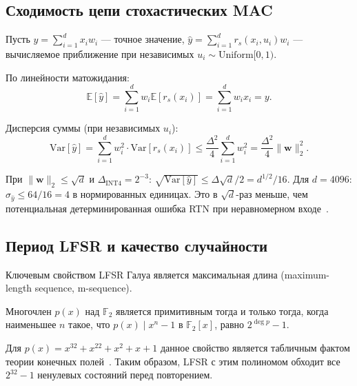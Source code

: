 \subsection{Сходимость цепи стохастических MAC}
\label{ssec:glava88-convergence}

Пусть $y = \sum_{i=1}^d x_i w_i$ — точное значение,
$\hat{y} = \sum_{i=1}^d r_s(x_i, u_i) w_i$ — вычисляемое приближение
при независимых $u_i \sim \mathrm{Uniform}[0,1)$.

По линейности матожидания:
\begin{equation}
  \mathbb{E}[\hat{y}] = \sum_{i=1}^d w_i \mathbb{E}[r_s(x_i)] = \sum_{i=1}^d w_i x_i = y.
  \label{eq:mac-unbiased}
\end{equation}

Дисперсия суммы (при независимых $u_i$):
\begin{equation}
  \mathrm{Var}[\hat{y}] = \sum_{i=1}^d w_i^2 \cdot \mathrm{Var}[r_s(x_i)]
  \leq \frac{\Delta^2}{4} \sum_{i=1}^d w_i^2 = \frac{\Delta^2}{4}\|\mathbf{w}\|_2^2.
  \label{eq:mac-variance}
\end{equation}

При $\|\mathbf{w}\|_2 \leq \sqrt{d}$ и $\Delta_{\text{INT4}} = 2^{-3}$:
$\sqrt{\mathrm{Var}[\hat{y}]} \leq \Delta \sqrt{d}/2 = d^{1/2} / 16$.
Для $d = 4096$: $\sigma_{\hat{y}} \leq 64/16 = 4$ в нормированных единицах.
Это в $\sqrt{d}$-раз меньше, чем потенциальная детерминированная
ошибка RTN при неравномерном входе~\cite{hubara2018}.

\subsection{Период LFSR и качество случайности}
\label{ssec:glava88-lfsr-period}

Ключевым свойством LFSR Галуа является максимальная длина
(maximum-length sequence, m-sequence).

\begin{proposition}
\label{prop:primitive-poly}
Многочлен $p(x)$ над $\mathbb{F}_2$ является примитивным тогда и только
тогда, когда наименьшее $n$ такое, что $p(x) \mid x^n - 1$ в
$\mathbb{F}_2[x]$, равно $2^{\deg p} - 1$.
\end{proposition}

Для $p(x) = x^{32} + x^{22} + x^2 + x + 1$ данное свойство
является табличным фактом теории конечных полей~\cite{micikevicius2017mixed}.
Таким образом, LFSR с этим полиномом обходит все $2^{32}-1$
ненулевых состояний перед повторением.


